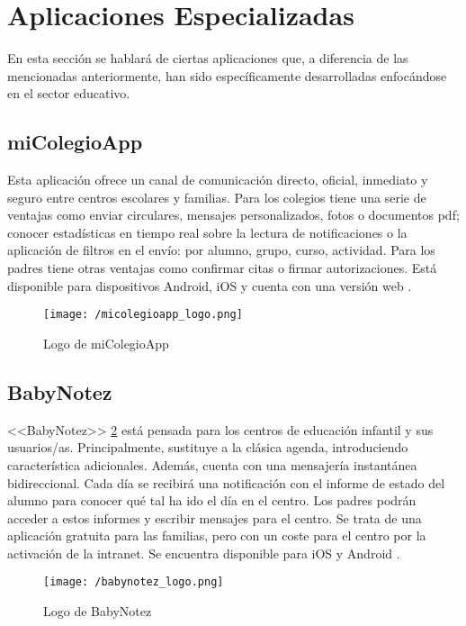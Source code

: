 \newpage

\section{Aplicaciones Especializadas}
En esta sección se hablará de ciertas aplicaciones que, a diferencia de las mencionadas anteriormente, han sido específicamente desarrolladas enfocándose en el sector educativo.

\subsection{miColegioApp}
Esta aplicación ofrece un canal de comunicación directo, oficial, inmediato y seguro entre centros escolares y familias. Para los colegios tiene una serie de ventajas como enviar circulares, mensajes personalizados, fotos o documentos pdf; conocer estadísticas en tiempo real sobre la lectura de notificaciones o la aplicación de filtros en el envío: por alumno, grupo, curso, actividad. Para los padres tiene otras ventajas como confirmar citas o firmar autorizaciones. Está disponible para dispositivos Android, iOS y cuenta con una versión web \cite{creaTactil}.

\begin{figure}[!h]
	\begin{center}
		\texttt{[image: /micolegioapp\_logo.png]}
		\caption{Logo de miColegioApp}
		\label{fig:micolegioapp}
	\end{center}
\end{figure}

\subsection{BabyNotez}
<<BabyNotez>> \ref{fig:babynotez} está pensada para los centros de educación infantil y sus usuarios/as. Principalmente, sustituye a la clásica agenda, introduciendo característica adicionales. Además, cuenta con una mensajería instantánea bidireccional. Cada día se recibirá una notificación con el informe de estado del alumno para conocer qué tal ha ido el día en el centro. Los padres podrán acceder a estos informes y escribir mensajes para el centro. Se trata de una aplicación gratuita para las familias, pero con un coste para el centro por la activación de la intranet. Se encuentra disponible para iOS y Android \cite{Educo2016}.

\begin{figure}[!h]
	\begin{center}
		\texttt{[image: /babynotez\_logo.png]}
		\caption{Logo de BabyNotez}
		\label{fig:babynotez}
	\end{center}
\end{figure}

